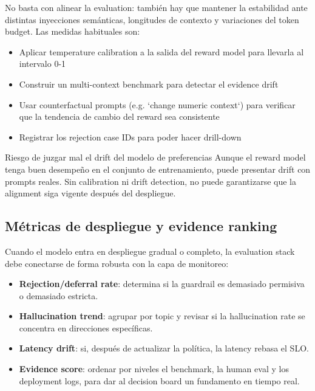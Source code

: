 \documentclass[a4paper]{article}
\begin{document}
No basta con alinear la evaluation: también hay que mantener la estabilidad ante distintas inyecciones semánticas, longitudes de contexto y variaciones del token budget. Las medidas habituales son:

\begin{itemize}
    \item Aplicar temperature calibration a la salida del reward model para llevarla al intervalo 0-1
    \item Construir un multi-context benchmark para detectar el evidence drift
    \item Usar counterfactual prompts (e.g. `change numeric context`) para verificar que la tendencia de cambio del reward sea consistente
    \item Registrar los rejection case IDs para poder hacer drill-down
\end{itemize}

\begin{warningbox}{Riesgo de juzgar mal el drift del modelo de preferencias}
Aunque el reward model tenga buen desempeño en el conjunto de entrenamiento, puede presentar drift con prompts reales. Sin calibration ni drift detection, no puede garantizarse que la alignment siga vigente después del despliegue.
\end{warningbox}

\subsection{Métricas de despliegue y evidence ranking}

Cuando el modelo entra en despliegue gradual o completo, la evaluation stack debe conectarse de forma robusta con la capa de monitoreo:
\begin{itemize}
    \item \textbf{Rejection/deferral rate}: determina si la guardrail es demasiado permisiva o demasiado estricta.
    \item \textbf{Hallucination trend}: agrupar por topic y revisar si la hallucination rate se concentra en direcciones específicas.
    \item \textbf{Latency drift}: si, después de actualizar la política, la latency rebasa el SLO.
    \item \textbf{Evidence score}: ordenar por niveles el benchmark, la human eval y los deployment logs, para dar al decision board un fundamento en tiempo real.
\end{itemize}
\end{document}
